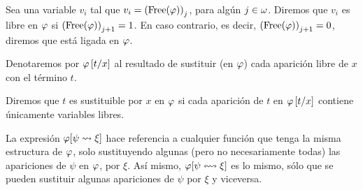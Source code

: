 \begin{defn}
    Sea una variable $v_i$ tal que $v_i={(\text{Free}(\varphi))}_{j}$, para algún $j\in\omega$.
    Diremos que $v_i$ es libre en $\varphi$ si ${(\text{Free}(\varphi))}_{j+1}=1$. En caso contrario, es decir, ${(\text{Free}(\varphi))}_{j+1}=0$, diremos que está ligada en $\varphi$.
\end{defn}
\begin{obs}
    Denotaremos por $\varphi\left[t/x\right]$ al resultado de sustituir (en $\varphi$) cada aparición libre de $x$ con el término $t$.
\end{obs}
\begin{defn}
    Diremos que $t$ es sustituible por $x$ en $\varphi$ si cada aparición de $t$ en $\varphi\left[t/x\right]$ contiene únicamente variables libres.
\end{defn}
\begin{obs}
    La expresión $\varphi[\psi\rightsquigarrow\xi]$ hace referencia a cualquier función que tenga la misma estructura de $\varphi$, solo sustituyendo algunas (pero no necesariamente todas) las apariciones de $\psi$ en $\varphi$, por $\xi$. Así mismo, $\varphi[\psi\leftrightsquigarrow\xi]$ es lo mismo, sólo que se pueden sustituir algunas apariciones de $\psi$ por $\xi$ y viceversa.
\end{obs}

